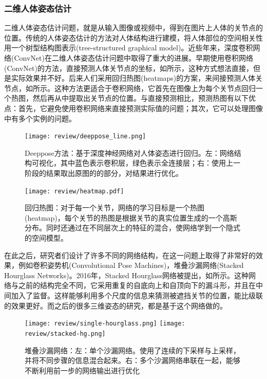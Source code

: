\subsubsection{二维人体姿态估计}
二维人体姿态估计问题，就是从输入图像或视频中，得到在图片上人体的关节点的位置。传统的人体姿态估计的方法对人体结构进行建模，将人体部位的空间相关性用一个树型结构图表示(tree-structured graphical model)\autocite{eichner20122d}。近些年来，深度卷积网络(ConvNet)在二维人体姿态估计问题中取得了重大的进展。早期使用卷积网络(ConvNet)的方法，直接预测人体关节点的坐标\autocite{toshev2014deep}，如所示，这种方式想法直接，但是实际效果并不好。后来人们采用回归热图(heatmaps)\autocite{pfister2015flowing}的方案，来间接预测人体关节点，如所示。这种方法更适合于卷积网络，它首先在图像上为每个关节点回归一个热图，然后再从中提取出关节点的位置。与直接预测相比，预测热图有以下优点：首先，它避免使用卷积网络来直接预测实际值的问题；其次，它可以处理图像中有多个实例的问题。
\begin{figure}[ht]
    \texttt{[image: review/deeppose\_line.png]}
    \caption{Deeppose方法\autocite{toshev2014deep}：基于深度神经网络对人体姿态进行回归。左：网络结构可视化，其中蓝色表示卷积层，绿色表示全连接层；右：使用上一阶段的结果取出原图的的部分，对结果进行优化。}\label{fig:deeppose}
\end{figure}

\begin{figure}[ht]
    \texttt{[image: review/heatmap.pdf]}
    \caption{回归热图\autocite{pfister2015flowing}：对于每一个关节，网络的学习目标是一个热图(heatmap)，每个关节的热图是根据关节的真实位置生成的一个高斯分布。同时还通过在不同层次上的特征的混合，使网络学到一个隐式的空间模型。}\label{fig:heatmap}
\end{figure}

在此之后，研究者们设计了许多不同的网络结构，在这一问题上取得了非常好的效果，例如卷积姿势机(Convolutional Pose Machines)，堆叠沙漏网络(Stacked Hourglass Networks)\autocite{newell2016stacked}。2016年，Stacked Hourglass网络\autocite{newell2016stacked}被提出，如所示。这种网络与之前的结构完全不同，它采用重复的自底向上和自顶向下的漏斗形，并且在中间加入了监督。这样能够利用多个尺度的信息来猜测被遮挡关节的位置，能比级联的效果更好。而之后的很多三维姿态的研究，都是基于这个网络做的。

\begin{figure}[ht]
    \texttt{[image: review/single-hourglass.png]}
    \texttt{[image: review/stacked-hg.png]}
    \caption{堆叠沙漏网络\autocite{newell2016stacked}：左：单个沙漏网络。使用了连续的下采样与上采样，并将不同步骤的信息混合起来。右：多个沙漏网络串联在一起，能够不断利用前一步的网络输出进行优化}\label{fig:hourglass}
\end{figure}


